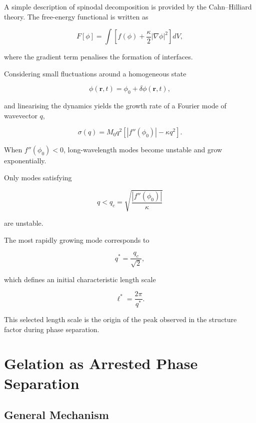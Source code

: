 \documentclass[11pt,a4paper]{article}
\begin{document}
A simple description of spinodal decomposition is provided by the Cahn--Hilliard theory. The free-energy functional is written as

\begin{equation}
F[\phi]
=
\int
\left[
f(\phi)
+
\frac{\kappa}{2}
|\nabla\phi|^2
\right]
dV,
\end{equation}

where the gradient term penalises the formation of interfaces.

Considering small fluctuations around a homogeneous state

\begin{equation}
\phi(\mathbf r,t)
=
\phi_0+\delta\phi(\mathbf r,t),
\end{equation}

and linearising the dynamics yields the growth rate of a Fourier mode of wavevector $q$,

\begin{equation}
\sigma(q)
=
M_0 q^2
\left[
|f''(\phi_0)|
-
\kappa q^2
\right].
\label{eq:cahn}
\end{equation}

When $f''(\phi_0)<0$, long-wavelength modes become unstable and grow exponentially.

Only modes satisfying

\begin{equation}
q<q_c
=
\sqrt{\frac{|f''(\phi_0)|}{\kappa}}
\end{equation}

are unstable.

The most rapidly growing mode corresponds to

\begin{equation}
q^*
=
\frac{q_c}{\sqrt{2}},
\end{equation}

which defines an initial characteristic length scale

\begin{equation}
\ell^*
=
\frac{2\pi}{q^*}.
\end{equation}

This selected length scale is the origin of the peak observed in the structure factor during phase separation.

\section{Gelation as Arrested Phase Separation}

\subsection{General Mechanism}
\end{document}
